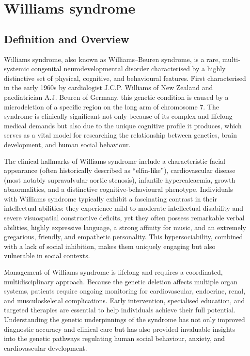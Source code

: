 \chapter{Williams syndrome}

\section*{Definition and Overview}
Williams syndrome, also known as Williams--Beuren syndrome, is a rare, multi-systemic congenital neurodevelopmental disorder characterised by a highly distinctive set of physical, cognitive, and behavioural features. First characterised in the early 1960s by cardiologist J.C.P. Williams of New Zealand and paediatrician A.J. Beuren of Germany, this genetic condition is caused by a microdeletion of a specific region on the long arm of chromosome 7. The syndrome is clinically significant not only because of its complex and lifelong medical demands but also due to the unique cognitive profile it produces, which serves as a vital model for researching the relationship between genetics, brain development, and human social behaviour.

The clinical hallmarks of Williams syndrome include a characteristic facial appearance (often historically described as ``elfin-like''), cardiovascular disease (most notably supravalvular aortic stenosis), infantile hypercalcaemia, growth abnormalities, and a distinctive cognitive-behavioural phenotype. Individuals with Williams syndrome typically exhibit a fascinating contrast in their intellectual abilities: they experience mild to moderate intellectual disability and severe visuospatial constructive deficits, yet they often possess remarkable verbal abilities, highly expressive language, a strong affinity for music, and an extremely gregarious, friendly, and empathetic personality. This hypersociability, combined with a lack of social inhibition, makes them uniquely engaging but also vulnerable in social contexts.

Management of Williams syndrome is lifelong and requires a coordinated, multidisciplinary approach. Because the genetic deletion affects multiple organ systems, patients require ongoing monitoring for cardiovascular, endocrine, renal, and musculoskeletal complications. Early intervention, specialised education, and targeted therapies are essential to help individuals achieve their full potential. Understanding the genetic underpinnings of the syndrome has not only improved diagnostic accuracy and clinical care but has also provided invaluable insights into the genetic pathways regulating human social behaviour, anxiety, and cardiovascular development.

